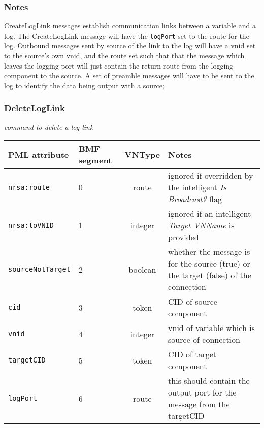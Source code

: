 \documentclass[pdftex,a4paper]{article}
\newcommand{\XMLfont}[1]{{\tt \small #1}}
\begin{document}
\subsubsection*{Notes}

CreateLogLink messages establish communication links between a
variable and a log. The CreateLogLink message will have the
\XMLfont{logPort} set to the route for the log. Outbound messages sent
by source of the link to the log will have a vnid set to the source's
own vnid, and the route set such that that the message which leaves
the logging port will just contain the return route from the logging
component to the source. A set of preamble messages will have to be
sent to the log to identify the data being output with a source;

\clearpage

\subsubsection{DeleteLogLink}

{\em command to delete a log link}

\begin{table}[!h]
  \begin{center}
    \label{tab:DeleteLink}
    \begin{tabular}{|l|p{13mm}|c|p{60mm}|}
      \hline

      \textbf{PML attribute} & \textbf{BMF segment} & \textbf{VNType}
      & \textbf{Notes} \\\hline

      \XMLfont{nrsa:route} & 0 & route & ignored if overridden by the
      intelligent {\em Is Broadcast?} flag \\\hline

      \XMLfont{nrsa:toVNID} & 1 & integer & ignored if an intelligent {\em
      Target VNName} is provided \\\hline

      \XMLfont{sourceNotTarget} & 2 & boolean & whether the message is
      for the source (true) or the target (false) of the connection
      \\\hline

      \XMLfont{cid} & 3 & token & CID of source component
      \\\hline

      \XMLfont{vnid} & 4 & integer & vnid of variable which is
      source of connection \\\hline

      \XMLfont{targetCID} & 5 & token & CID of target component
      \\\hline

      \XMLfont{logPort} & 6 & route & this should contain the output
      port for the message from the targetCID \\\hline

    \end{tabular}
  \end{center}
\end{table}
\end{document}
